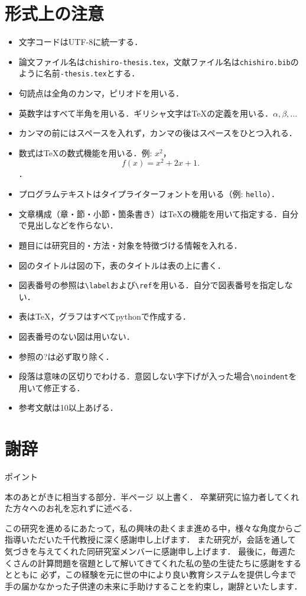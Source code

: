 \documentclass[a4j,11pt,report]{jsbook}
\newcommand{\point}[1]{
\begin{itembox}[l]{ポイント}
  #1
\end{itembox}
}
\begin{document}
\chapter{形式上の注意}

\begin{itemize}
  \item 文字コードはUTF-8に統一する．
  \item 論文ファイル名は\texttt{chishiro-thesis.tex}，文献ファイル名は\texttt{chishiro.bib}のように名前\texttt{-thesis.tex}とする．
  \item 句読点は全角のカンマ，ピリオドを用いる．
  \item 英数字はすべて半角を用いる．ギリシャ文字は{\TeX}の定義を用いる．$\alpha, \beta, ...$
  \item カンマの前にはスペースを入れず，カンマの後はスペースをひとつ入れる．
  \item 数式は{\TeX}の数式機能を用いる．例: $x^2$，\[f(x) = x^2 + 2x + 1.\]．
  \item プログラムテキストはタイプライターフォントを用いる（例: \texttt{hello}）．
  \item 文章構成（章・節・小節・箇条書き）は{\TeX}の機能を用いて指定する．自分で見出しなどを作らない．
  \item 題目には研究目的・方法・対象を特徴づける情報を入れる．
  \item 図のタイトルは図の下，表のタイトルは表の上に書く．
  \item 図表番号の参照は\verb#\label#および\verb#\ref#を用いる．自分で図表番号を指定しない．
  \item 表は{\TeX}，グラフはすべてpythonで作成する．
  \item 図表番号のない図は用いない．
  \item 参照の?は必ず取り除く．
  \item 段落は意味の区切りでわける．意図しない字下げが入った場合\verb#\noindent#を用いて修正する．
  \item 参考文献は10以上あげる．
\end{itemize}
\fi


\chapter*{謝辞 \label{ch:acknowledgement}}
\thispagestyle{empty}
\if
\point{
本のあとがきに相当する部分．半ページ 以上書く．
卒業研究に協力者してくれた方々へのお礼を忘れずに述べる．
}
\fi
この研究を進めるにあたって，私の興味の赴くまま進める中，様々な角度からご指導いただいた千代教授に深く感謝申し上げます．
また研究が，会話を通して気づきを与えてくれた同研究室メンバーに感謝申し上げます．
最後に，毎週たくさんの計算問題を宿題として解いてきてくれた私の塾の生徒たちに感謝をするとともに
必ず，この経験を元に世の中により良い教育システムを提供し今まで手の届かなかった子供達の未来に手助けすることを約束し，謝辞といたします．



\end{document}

